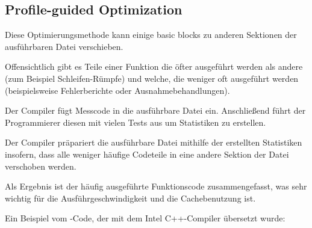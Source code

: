 

\subsection{Profile-guided Optimization}
\label{PGO}

\myindex{\oracle}

Diese Optimierungsmethode kann einige \gls{basic block}s zu anderen Sektionen der
ausführbaren Datei verschieben.

Offensichtlich gibt es Teile einer Funktion die öfter ausgeführt werden als andere
(zum Beispiel Schleifen-Rümpfe) und welche, die weniger oft ausgeführt werden
(beispielsweise Fehlerberichte oder Ausnahmebehandlungen).

Der Compiler fügt Messcode in die ausführbare Datei ein. Anschließend führt der
Programmierer diesen mit vielen Tests aus um Statistiken zu erstellen.

Der Compiler präpariert die ausführbare Datei mithilfe der erstellten Statistiken
insofern, dass alle weniger häufige Codeteile in eine andere Sektion der Datei
verschoben werden.

Als Ergebnis ist der häufig ausgeführte Funktionscode zusammengefasst, was sehr
wichtig für die Ausführgeschwindigkeit und die Cachebenutzung ist.

Ein Beispiel vom \oracle-Code, der mit dem Intel C++-Compiler übersetzt wurde:

